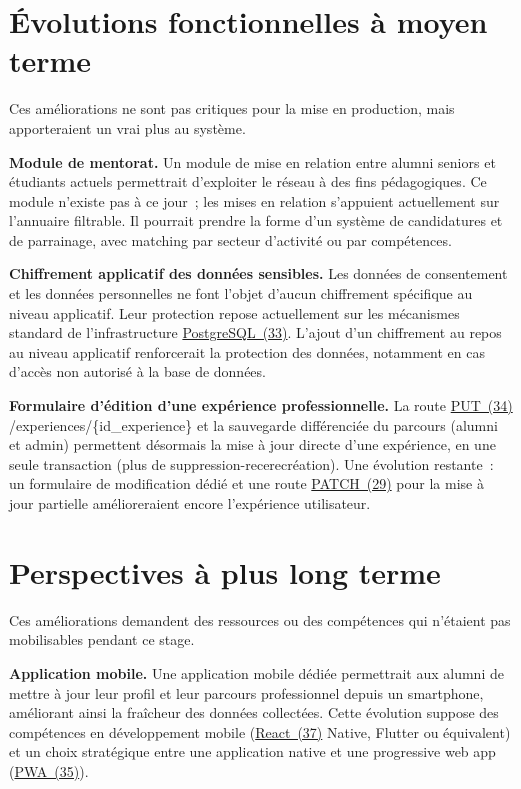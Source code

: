 \documentclass[12pt,a4paper]{report}
\begin{document}
\section{Évolutions fonctionnelles à moyen terme}

Ces améliorations ne sont pas critiques pour la mise en production, mais apporteraient un vrai plus au système.

\textbf{Module de mentorat.} Un module de mise en relation entre alumni seniors et étudiants actuels permettrait d'exploiter le réseau à des fins pédagogiques. Ce module n'existe pas à ce jour~; les mises en relation s'appuient actuellement sur l'annuaire filtrable. Il pourrait prendre la forme d'un système de candidatures et de parrainage, avec matching par secteur d'activité ou par compétences.

\textbf{Chiffrement applicatif des données sensibles.} Les données de consentement et les données personnelles ne font l'objet d'aucun chiffrement spécifique au niveau applicatif. Leur protection repose actuellement sur les mécanismes standard de l'infrastructure \hyperlink{abbr-PostgreSQL}{PostgreSQL~(33)}. L'ajout d'un chiffrement au repos au niveau applicatif renforcerait la protection des données, notamment en cas d'accès non autorisé à la base de données.

\textbf{Formulaire d'édition d'une expérience professionnelle.} La route \hyperlink{abbr-PUT}{PUT~(34)} /experiences/\{id\_experience\} et la sauvegarde différenciée du parcours (alumni et admin) permettent désormais la mise à jour directe d'une expérience, en une seule transaction (plus de suppression-recerecréation). Une évolution restante~: un formulaire de modification dédié et une route \hyperlink{abbr-PATCH}{PATCH~(29)} pour la mise à jour partielle amélioreraient encore l'expérience utilisateur.

\section{Perspectives à plus long terme}

Ces améliorations demandent des ressources ou des compétences qui n'étaient pas mobilisables pendant ce stage.

\textbf{Application mobile.} Une application mobile dédiée permettrait aux alumni de mettre à jour leur profil et leur parcours professionnel depuis un smartphone, améliorant ainsi la fraîcheur des données collectées. Cette évolution suppose des compétences en développement mobile (\hyperlink{abbr-React}{React~(37)} Native, Flutter ou équivalent) et un choix stratégique entre une application native et une progressive web app (\hyperlink{abbr-PWA}{PWA~(35)}).
\end{document}

